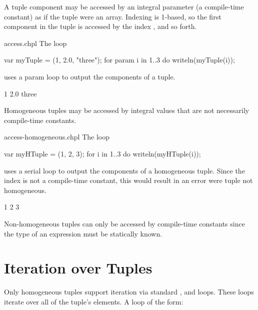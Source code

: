 A tuple component may be accessed by an integral parameter (a compile-time
constant) as if the tuple were an array.  Indexing is 1-based, so the
first component in the tuple is accessed by the index , and so
forth.

\begin{chapelexample}{access.chpl}
The loop
\begin{chapel}
var myTuple = (1, 2.0, "three");
for param i in 1..3 do
  writeln(myTuple(i));
\end{chapel}
uses a param loop to output the components of a tuple.
\begin{chapelpost}
\end{chapelpost}
\begin{chapeloutput}
1
2.0
three
\end{chapeloutput}
\end{chapelexample}

Homogeneous tuples may be accessed by integral values that are not
necessarily compile-time constants.

\begin{chapelexample}{access-homogeneous.chpl}
The loop
\begin{chapel}
var myHTuple = (1, 2, 3);
for i in 1..3 do
  writeln(myHTuple(i));
\end{chapel}
uses a serial loop to output the components of a homogeneous tuple.
Since the index is not a compile-time constant, this would result in
an error were tuple not homogeneous.
\begin{chapelpost}
\end{chapelpost}
\begin{chapeloutput}
1
2
3
\end{chapeloutput}
\end{chapelexample}

\begin{rationale}
Non-homogeneous tuples can only be accessed by compile-time constants
since the type of an expression must be statically known.
\end{rationale}

\section{Iteration over Tuples}
\label{Iteration_over_Tuples}

Only homogeneous tuples support iteration via
standard ,  and  loops.  These loops
iterate over all of the tuple's elements.  A loop of the form:

